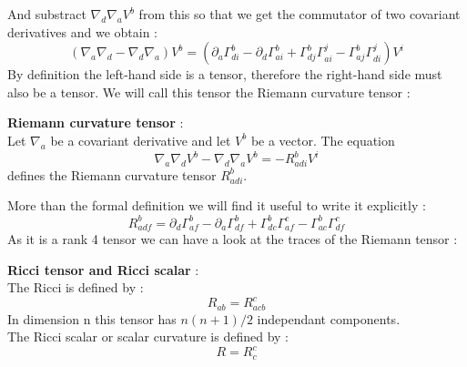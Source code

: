 \documentclass[a4paper,12pt]{article}
\theoremstyle{definition}
\begin{document}
And substract $\nabla _d \nabla _a V^b$ from this so that we get the commutator of two covariant derivatives and we obtain :
\begin{equation}
	(\nabla _a \nabla _d - \nabla _d \nabla _a)V^b=(\partial_a \Gamma^b_{di}-\partial_d \Gamma^b_{ai}+\Gamma^b_{dj}\Gamma^j_{ai}-\Gamma^b_{aj}\Gamma^j_{di})V^i
\end{equation}
By definition the left-hand side is a tensor, therefore the right-hand side must also be a tensor.
We will call this tensor the Riemann curvature tensor :
\begin{definition}
	\textbf{Riemann curvature tensor} :\\
	Let $\nabla_a$ be a covariant derivative and let $V^b$ be a vector. The equation
	\begin{equation}
		\nabla _a \nabla _d V^b - \nabla _d \nabla _aV^b=-R_{adi}^b V^i
	\end{equation}
	defines the Riemann curvature tensor $R_{adi}^b$.
\end{definition}
More than the formal definition we will find it useful to write it explicitly :
\begin{equation} \label{Riemm}
	R_{adf}^b=\partial_d\Gamma^b_{af}-\partial_a\Gamma^b_{df}+\Gamma^b_{dc}\Gamma^c_{af}-\Gamma^b_{ac}\Gamma^c_{df}
\end{equation}
As it is a rank 4 tensor we can have a look at the traces of the Riemann tensor :
\begin{definition}
	\textbf{Ricci tensor and Ricci scalar} :\\
	The Ricci is defined by :
	\begin{equation}\label{Ricc}
		R_{ab}=R_{acb}^c
	\end{equation}
	In dimension n this tensor has $n(n+1)/2$ independant components.\\
	The Ricci scalar or scalar curvature is defined by :
	\begin{equation}
		R=R_c^c
	\end{equation}
\end{definition}
\end{document}
